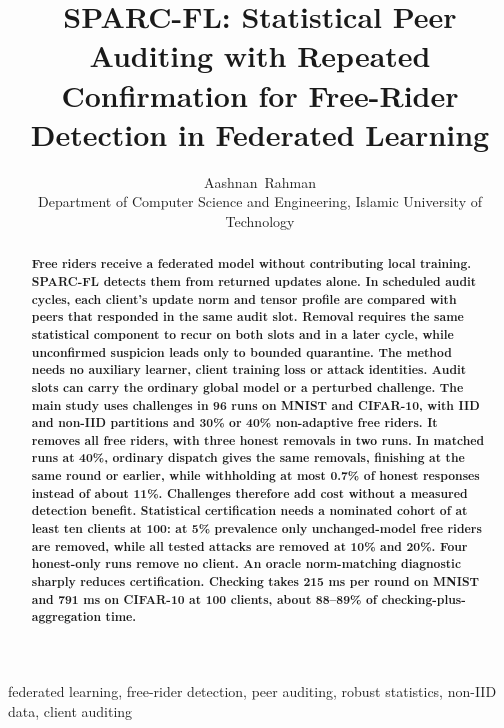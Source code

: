 \documentclass[journal]{IEEEtran}
\title{SPARC-FL: Statistical Peer Auditing with Repeated Confirmation for Free-Rider Detection in Federated Learning}
\author{Aashnan~Rahman\\{\normalsize Department of Computer Science and Engineering, \newline Islamic University of Technology}}
\makeatletter
\renewcommand{\section}{\@startsection{section}{1}{\z@}{1.5ex}{0.7ex}{\normalfont\normalsize\centering\scshape}}
\makeatother
\begin{document}
\maketitle
\raggedbottom
\setlength{\parskip}{0pt plus 2pt minus 0.5pt}
\makeatletter
\def\@textbottom{\vskip\z@ plus 6pt}
\makeatother
\setlength{\abovedisplayskip}{6pt plus 1pt minus 1pt}
\setlength{\belowdisplayskip}{6pt plus 1pt minus 1pt}
\setlength{\abovedisplayshortskip}{3pt plus 1pt minus 1pt}
\setlength{\belowdisplayshortskip}{3pt plus 1pt minus 1pt}

\begin{abstract}
\bfseries
Free riders receive a federated model without contributing local training.
SPARC-FL detects them from returned updates alone. In scheduled audit
cycles, each client's update norm and tensor profile are compared with
peers that responded in the same audit slot. Removal requires the same
statistical component to recur on both slots and in a later cycle, while
unconfirmed suspicion leads only to bounded quarantine. The method needs
no auxiliary learner, client training loss or attack identities. Audit
slots can carry the ordinary global model or a perturbed challenge. The
main study uses challenges in 96 runs on MNIST and CIFAR-10, with IID and
non-IID partitions and 30\% or 40\% non-adaptive free riders. It removes
all free riders, with three honest removals in two runs. In matched runs
at 40\%, ordinary dispatch gives the same removals, finishing at the same
round or earlier, while withholding at most 0.7\% of honest responses
instead of about 11\%. Challenges therefore add cost without a measured
detection benefit. Statistical certification needs a nominated cohort of
at least ten clients at 100: at 5\% prevalence only unchanged-model free
riders are removed, while all tested attacks are removed at 10\% and 20\%.
Four honest-only runs remove no client. An oracle norm-matching diagnostic
sharply reduces certification. Checking takes 215 ms per round on MNIST
and 791 ms on CIFAR-10 at 100 clients, about 88--89\% of
checking-plus-aggregation time.
\end{abstract}

\begin{IEEEkeywords}
federated learning, free-rider detection, peer auditing, robust statistics,
non-IID data, client auditing
\end{IEEEkeywords}

\section{Introduction}
\end{document}
